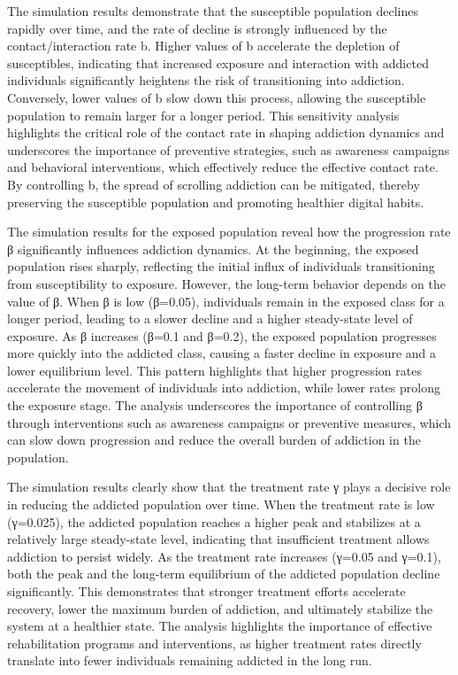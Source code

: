 \documentclass[10pt]{NSP1}
\begin{document}
\par\medskip{}\smallskip

The simulation results demonstrate that the susceptible population declines rapidly over time, and the rate of decline is strongly influenced by the contact/interaction rate b. Higher values of b accelerate the depletion of susceptibles, indicating that increased exposure and interaction with addicted individuals significantly heightens the risk of transitioning into addiction. Conversely, lower values of b slow down this process, allowing the susceptible population to remain larger for a longer period. This sensitivity analysis highlights the critical role of the contact rate in shaping addiction dynamics and underscores the importance of preventive strategies, such as awareness campaigns and behavioral interventions, which effectively reduce the effective contact rate. By controlling b, the spread of scrolling addiction can be mitigated, thereby preserving the susceptible population and promoting healthier digital habits.

The simulation results for the exposed population reveal how the progression rate β significantly influences addiction dynamics. At the beginning, the exposed population rises sharply, reflecting the initial influx of individuals transitioning from susceptibility to exposure. However, the long-term behavior depends on the value of β. When β is low (β=0.05), individuals remain in the exposed class for a longer period, leading to a slower decline and a higher steady-state level of exposure. As β increases (β=0.1 and β=0.2), the exposed population progresses more quickly into the addicted class, causing a faster decline in exposure and a lower equilibrium level. This pattern highlights that higher progression rates accelerate the movement of individuals into addiction, while lower rates prolong the exposure stage. The analysis underscores the importance of controlling β through interventions such as awareness campaigns or preventive measures, which can slow down progression and reduce the overall burden of addiction in the population.

The simulation results clearly show that the treatment rate γ plays a decisive role in reducing the addicted population over time. When the treatment rate is low (γ=0.025), the addicted population reaches a higher peak and stabilizes at a relatively large steady-state level, indicating that insufficient treatment allows addiction to persist widely. As the treatment rate increases (γ=0.05 and γ=0.1), both the peak and the long-term equilibrium of the addicted population decline significantly. This demonstrates that stronger treatment efforts accelerate recovery, lower the maximum burden of addiction, and ultimately stabilize the system at a healthier state. The analysis highlights the importance of effective rehabilitation programs and interventions, as higher treatment rates directly translate into fewer individuals remaining addicted in the long run.
\end{document}
